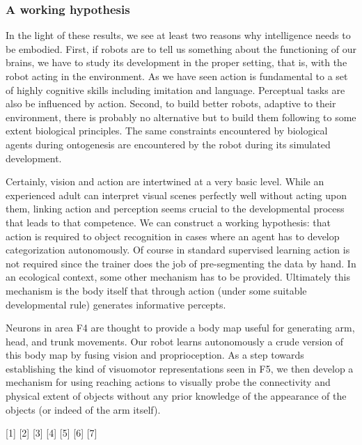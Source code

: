 \subsubsection*{A working hypothesis}

In the light of these results, we see at least two reasons why
intelligence needs to be embodied. First, if robots are to tell us
something about the functioning of our brains, we have to study its
development in the proper setting, that is, with the robot acting in
the environment. As we have seen action is fundamental to a set of
highly cognitive skills including imitation and language. Perceptual
tasks are also be influenced by action. Second, to build better
robots, adaptive to their environment, there is probably no
alternative but to build them following to some extent biological
principles. The same constraints encountered by biological agents
during ontogenesis are encountered by the robot during its simulated
development.

Certainly, vision and action are intertwined at a very basic level.
While an
experienced adult can interpret visual scenes perfectly well without
acting upon them, linking action and perception seems crucial to the
developmental process that leads to that competence.  We can construct
a working hypothesis: that action is required to object recognition in
cases where an agent has to develop categorization autonomously.  Of
course in standard supervised learning action is not required since
the trainer does the job of pre-segmenting the data by hand.  In an
ecological context, some other mechanism has to be provided.
Ultimately this mechanism is the body itself that through action
(under some suitable developmental rule) generates informative
percepts.

Neurons in area F4 are thought to provide a body map useful for
generating arm, head, and trunk movements. Our robot learns
autonomously a crude version of this body map by fusing vision and
proprioception.  As a step towards establishing the kind of visuomotor
representations seen in F5, we then develop a mechanism for using
reaching actions to visually probe the connectivity and physical
extent of objects without any prior knowledge of the appearance of the
objects (or indeed of the arm itself).


\ifverbose

[1] \cite{maturana98tree}
[2] \cite{milner95visual}
[3] \cite{jeannerod97cognitive}
[4] \cite{konczak}
[5] \cite{fadiga00visuomotor}
[6] \cite{gibson77theory}
[7] \cite{rizzolatti98language}


